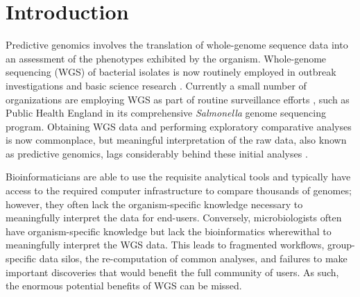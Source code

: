 \documentclass[doublespacing, linenumbers]{bmcart}
\begin{document}



\section*{Introduction}
Predictive genomics involves the translation of whole-genome sequence data into an assessment of the phenotypes exhibited by the organism. Whole-genome sequencing (WGS) of bacterial isolates is now routinely employed in outbreak investigations and basic science research \cite{reuter_pilot_2013,fittipaldi_integrated_2013}. Currently a small number of organizations are employing WGS as part of routine surveillance efforts \cite{zankari_genotyping_2013,cody_real-time_2013}, such as Public Health England in its comprehensive \textit{Salmonella} genome sequencing program. Obtaining WGS data and performing exploratory comparative analyses is now commonplace, but meaningful interpretation of the raw data, also known as predictive genomics, lags considerably behind these initial analyses \cite{sherry_outbreak_2013}.

Bioinformaticians are able to use the requisite analytical tools and typically have access to the required computer infrastructure to compare thousands of genomes; however, they often lack the organism-specific knowledge necessary to meaningfully interpret the data for end-users. Conversely, microbiologists often have organism-specific knowledge but lack the bioinformatics wherewithal to meaningfully interpret the WGS data. This leads to fragmented workflows, group-specific data silos, the re-computation of common analyses, and failures to make important discoveries that would benefit the full community of users. As such, the enormous potential benefits of WGS can be missed.
\end{document}
